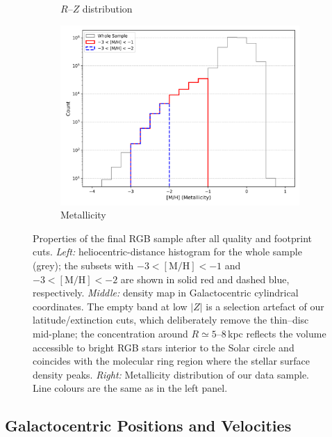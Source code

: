 \documentclass[a4paper,12pt]{article}
\begin{document}
\begin{figure}
\begin{subfigure}[b]{0.32\textwidth}
    \caption{$R$–$Z$ distribution}
    \label{fig:ZR_dist}
  \end{subfigure}\hfill
  \begin{subfigure}[b]{0.32\textwidth}
    \includegraphics[width=\textwidth]{../figures/metallicity_distribution.png}
    \caption{Metallicity}
    \label{fig:met_dist}
  \end{subfigure}

  \caption{Properties of the final RGB sample after all quality and footprint cuts.
           \textit{Left:} heliocentric-distance histogram for the whole sample (grey); the
           subsets with $-3<\mathrm{[M/H]}<-1$ and $-3<\mathrm{[M/H]}<-2$ are shown in
           solid red and dashed blue, respectively.  
           \textit{Middle:} density map in Galactocentric cylindrical coordinates.  
           The empty band at low $|Z|$ is a selection artefact of our
           latitude/extinction cuts, which deliberately remove the thin–disc mid-plane;
           the concentration around $R\!\simeq\!5$–$8$\,kpc reflects the volume
           accessible to bright RGB stars interior to the Solar circle and coincides
           with the molecular ring region where the stellar surface density peaks.  
           \textit{Right:} Metallicity distribution of our data sample. Line colours are the same as in the left panel.}
  \label{fig:data_properties}
\end{figure}

\subsection{Galactocentric Positions and Velocities}
\label{subsec:velocities}
\end{document}
